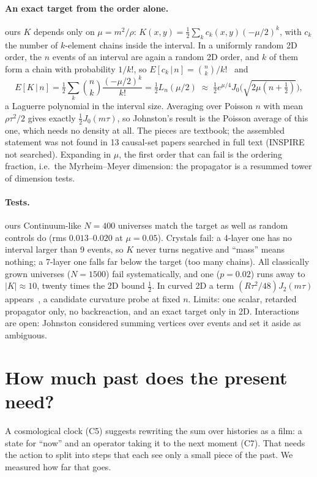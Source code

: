 \documentclass[11pt,a4paper]{article}
\newcommand{\tagbox}[2]{\textsf{\scriptsize\colorbox{#1!12}{\textcolor{#1!70!black}{#2}}}}
\newcommand{\ours}{\tagbox{orange}{ours}}
\begin{document}
\paragraph{An exact target from the order alone.} \ours{} $K$ depends only on $\mu=m^2/\rho$: $K(x,y)=\tfrac12\sum_kc_k(x,y)(-\mu/2)^k$, with $c_k$ the number of $k$-element chains inside the interval. In a uniformly random 2D order, the $n$ events of an interval are again a random 2D order, and $k$ of them form a chain with probability $1/k!$, so $E[c_k\,|\,n]=\binom nk/k!$~\cite{Pinsky06} and
\begin{equation}
E[K\,|\,n]=\tfrac12\sum_k\binom nk\frac{(-\mu/2)^k}{k!}=\tfrac12L_n(\mu/2)\;\approx\;\tfrac12e^{\mu/4}J_0\!\big(\sqrt{2\mu(n+\tfrac12)}\big),
\end{equation}
a Laguerre polynomial in the interval size. Averaging over Poisson $n$ with mean $\rho\tau^2/2$ gives exactly $\tfrac12J_0(m\tau)$, so Johnston's result is the Poisson average of this one, which needs no density at all. The pieces are textbook; the assembled statement was not found in 13 causal-set papers searched in full text (INSPIRE not searched). Expanding in $\mu$, the first order that can fail is the ordering fraction, i.e.\ the Myrheim--Meyer dimension: the propagator is a resummed tower of dimension tests.

\paragraph{Tests.} \ours{} Continuum-like $N=400$ universes match the target as well as random controls do (rms $0.013$--$0.020$ at $\mu=0.05$). Crystals fail: a 4-layer one has no interval larger than 9 events, so $K$ never turns negative and ``mass'' means nothing; a 7-layer one falls far below the target (too many chains). All classically grown universes ($N=1500$) fail systematically, and one ($p=0.02$) runs away to $|K|\approx10$, twenty times the 2D bound $\tfrac12$. In curved 2D a term $(R\tau^2/48)J_2(m\tau)$ appears~\cite{NXDS17}, a candidate curvature probe at fixed $n$. Limits: one scalar, retarded propagator only, no backreaction, and an exact target only in 2D. Interactions are open: Johnston considered summing vertices over events and set it aside as ambiguous.

\section{How much past does the present need?}\label{sec:film}
A cosmological clock (C5) suggests rewriting the sum over histories as a film: a state for ``now'' and an operator taking it to the next moment (C7). That needs the action to split into steps that each see only a small piece of the past. We measured how far that goes.
\end{document}
